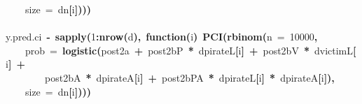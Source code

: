 \documentclass{article}
\makeatletter
\newcommand{\hlnumber}[1]{\textcolor[rgb]{0,0,0}{#1}}%
\newcommand{\hlfunctioncall}[1]{\textcolor[rgb]{.5,0,.33}{\textbf{#1}}}%
\newcommand{\hlkeyword}[1]{\textbf{#1}}%
\newcommand{\hlargument}[1]{\textcolor[rgb]{.69,.25,.02}{#1}}%
\newcommand{\hlformalargs}[1]{\hlargument{#1}}%
\newcommand{\hlassignement}[1]{\textbf{#1}}%
\newcommand{\hlsymbol}[1]{#1}%
\newcommand{\hlstd}[1]{\textcolor[rgb]{0,0,0}{#1}}%
\newenvironment{kframe}{%
 \def\FrameCommand##1{\hskip\@totalleftmargin \hskip-\fboxsep
 \colorbox{shadecolor}{##1}\hskip-\fboxsep
     \hskip-\linewidth \hskip-\@totalleftmargin \hskip\columnwidth}%
 \MakeFramed {\advance\hsize-\width
   \@totalleftmargin\z@ \linewidth\hsize
   \@setminipage}}%
 {\par\unskip\endMakeFramed}
\newenvironment{knitrout}{}{} %
\makeatother
\begin{document}
\begin{knitrout}
{\begin{kframe}
\begin{flushleft}
\hlstd{}{\ }{\ }{\ }{\ }\hlargument{size}{\ }\hlargument{=}{\ }\hlsymbol{d}\hlkeyword{\usebox{\hlnormalsizeboxdollar}}\hlsymbol{n}\hlkeyword{[}\hlsymbol{i}\hlkeyword{]}\hlkeyword{)}\hlkeyword{)}\hlkeyword{)}\hspace*{\fill}\\
\hlstd{}\hspace*{\fill}\\
\hlstd{}\hlsymbol{y.pred.ci}{\ }\hlassignement{\usebox{\hlnormalsizeboxlessthan}-}{\ }\hlfunctioncall{sapply}\hlkeyword{(}\hlnumber{1}\hlkeyword{:}\hlfunctioncall{nrow}\hlkeyword{(}\hlsymbol{d}\hlkeyword{)}\hlkeyword{,}{\ }\hlkeyword{function}\hlkeyword{(}\hlformalargs{i}\hlkeyword{)}{\ }\hlfunctioncall{PCI}\hlkeyword{(}\hlfunctioncall{rbinom}\hlkeyword{(}\hlargument{n}{\ }\hlargument{=}{\ }\hlnumber{10000}\hlkeyword{,}\hspace*{\fill}\\
\hlstd{}{\ }{\ }{\ }{\ }\hlargument{prob}{\ }\hlargument{=}{\ }\hlfunctioncall{logistic}\hlkeyword{(}\hlsymbol{post2}\hlkeyword{\usebox{\hlnormalsizeboxdollar}}\hlsymbol{a}{\ }\hlkeyword{+}{\ }\hlsymbol{post2}\hlkeyword{\usebox{\hlnormalsizeboxdollar}}\hlsymbol{bP}{\ }\hlkeyword{*}{\ }\hlsymbol{d}\hlkeyword{\usebox{\hlnormalsizeboxdollar}}\hlsymbol{pirateL}\hlkeyword{[}\hlsymbol{i}\hlkeyword{]}{\ }\hlkeyword{+}{\ }\hlsymbol{post2}\hlkeyword{\usebox{\hlnormalsizeboxdollar}}\hlsymbol{bV}{\ }\hlkeyword{*}{\ }\hlsymbol{d}\hlkeyword{\usebox{\hlnormalsizeboxdollar}}\hlsymbol{victimL}\hlkeyword{[}\hlsymbol{i}\hlkeyword{]}{\ }\hlkeyword{+}\hspace*{\fill}\\
\hlstd{}{\ }{\ }{\ }{\ }{\ }{\ }{\ }{\ }\hlsymbol{post2}\hlkeyword{\usebox{\hlnormalsizeboxdollar}}\hlsymbol{bA}{\ }\hlkeyword{*}{\ }\hlsymbol{d}\hlkeyword{\usebox{\hlnormalsizeboxdollar}}\hlsymbol{pirateA}\hlkeyword{[}\hlsymbol{i}\hlkeyword{]}{\ }\hlkeyword{+}{\ }\hlsymbol{post2}\hlkeyword{\usebox{\hlnormalsizeboxdollar}}\hlsymbol{bPA}{\ }\hlkeyword{*}{\ }\hlsymbol{d}\hlkeyword{\usebox{\hlnormalsizeboxdollar}}\hlsymbol{pirateL}\hlkeyword{[}\hlsymbol{i}\hlkeyword{]}{\ }\hlkeyword{*}{\ }\hlsymbol{d}\hlkeyword{\usebox{\hlnormalsizeboxdollar}}\hlsymbol{pirateA}\hlkeyword{[}\hlsymbol{i}\hlkeyword{]}\hlkeyword{)}\hlkeyword{,}\hspace*{\fill}\\
\hlstd{}{\ }{\ }{\ }{\ }\hlargument{size}{\ }\hlargument{=}{\ }\hlsymbol{d}\hlkeyword{\usebox{\hlnormalsizeboxdollar}}\hlsymbol{n}\hlkeyword{[}\hlsymbol{i}\hlkeyword{]}\hlkeyword{)}\hlkeyword{)}\hlkeyword{)}\hspace*{\fill}\\

\end{flushleft}
\end{kframe}}
\end{knitrout}
\end{document}
